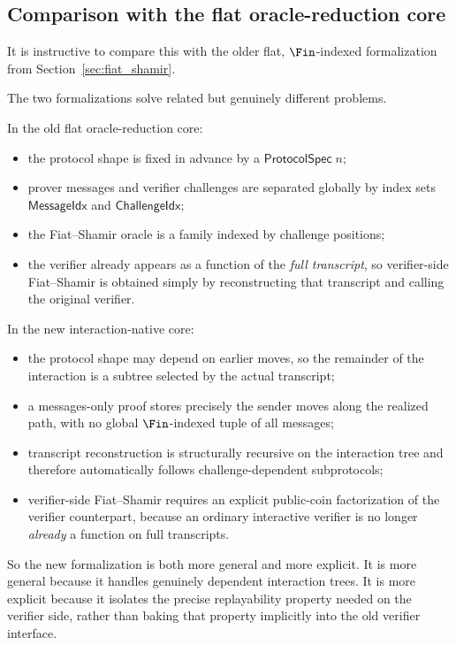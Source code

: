 \subsection{Comparison with the flat oracle-reduction core}

It is instructive to compare this with the older flat, $\Fin$-indexed
formalization from Section~\ref{sec:fiat_shamir}.

\begin{remark}
  \label{int:fiat-shamir-comparison}
  The two formalizations solve related but genuinely different problems.

  In the old flat oracle-reduction core:
  \begin{itemize}
    \item the protocol shape is fixed in advance by a
      $\mathsf{ProtocolSpec}\;n$;
    \item prover messages and verifier challenges are separated globally by
      index sets $\mathsf{MessageIdx}$ and $\mathsf{ChallengeIdx}$;
    \item the Fiat--Shamir oracle is a family indexed by challenge positions;
    \item the verifier already appears as a function of the \emph{full
      transcript}, so verifier-side Fiat--Shamir is obtained simply by
      reconstructing that transcript and calling the original verifier.
  \end{itemize}

  In the new interaction-native core:
  \begin{itemize}
    \item the protocol shape may depend on earlier moves, so the remainder of
      the interaction is a subtree selected by the actual transcript;
    \item a messages-only proof stores precisely the sender moves along the
      realized path, with no global $\Fin$-indexed tuple of all messages;
    \item transcript reconstruction is structurally recursive on the interaction
      tree and therefore automatically follows challenge-dependent subprotocols;
    \item verifier-side Fiat--Shamir requires an explicit public-coin
      factorization of the verifier counterpart, because an ordinary interactive
      verifier is no longer \emph{already} a function on full transcripts.
  \end{itemize}

  So the new formalization is both more general and more explicit.  It is more
  general because it handles genuinely dependent interaction trees.  It is more
  explicit because it isolates the precise replayability property needed on the
  verifier side, rather than baking that property implicitly into the old
  verifier interface.
\end{remark}

